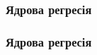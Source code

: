 ﻿\documentclass{beamer}
\begin{document}
\begin{frame}
  \frametitle{Ядрова регресія}
\end{frame}

\begin{frame}
  \frametitle{Ядрова регресія}
\end{frame}
\end{document}
